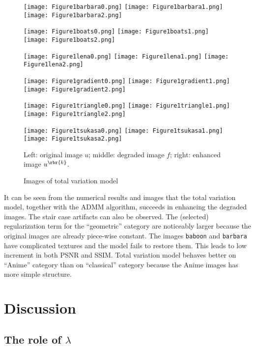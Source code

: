 \documentclass[english, nochinese]{pnote}
\begin{document}
\begin{figure}[htb]
{
\centering

\texttt{[image: Figure1barbara0.png]}
\texttt{[image: Figure1barbara1.png]}
\texttt{[image: Figure1barbara2.png]}

\texttt{[image: Figure1boats0.png]}
\texttt{[image: Figure1boats1.png]}
\texttt{[image: Figure1boats2.png]}

\texttt{[image: Figure1lena0.png]}
\texttt{[image: Figure1lena1.png]}
\texttt{[image: Figure1lena2.png]}

\texttt{[image: Figure1gradient0.png]}
\texttt{[image: Figure1gradient1.png]}
\texttt{[image: Figure1gradient2.png]}

\texttt{[image: Figure1triangle0.png]}
\texttt{[image: Figure1triangle1.png]}
\texttt{[image: Figure1triangle2.png]}

\texttt{[image: Figure1tsukasa0.png]}
\texttt{[image: Figure1tsukasa1.png]}
\texttt{[image: Figure1tsukasa2.png]}

\caption{Images of total variation model}
\label{Fig:Num}
}
{
\footnotesize Left: original image $u$; middle: degraded image $f$; right: enhanced image $u^{\rbr{k}}$.
}
\end{figure}

It can be seen from the numerical results and images that the total variation model, together with the ADMM algorithm, succeeds in enhancing the degraded images. The stair case artifacts can also be observed. The (selected) regularization term for the ``geometric'' category are noticeably larger because the original images are already piece-wise constant. The images \verb"baboon" and \verb"barbara" have complicated textures and the model fails to restore them. This leads to low increment in both PSNR and SSIM. Total variation model behaves better on ``Anime'' category than on ``classical'' category because the Anime images has more simple structure.

\section{Discussion}

\subsection{The role of $\lambda$}
\end{document}
